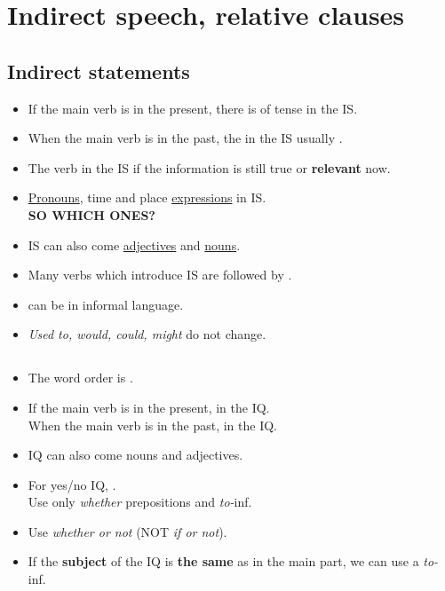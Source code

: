 \section{Indirect speech, relative clauses}

\subsection{Indirect statements}
\begin{itemize}
    \item If the main verb is in the present,
    there is  of tense in the IS.
    \item When the main verb is in the past,
    the  in the IS usually .
    \item The verb in the IS 
    if the information is still true or \textbf{relevant} now.
    \item \underline{Pronouns}, time and place \underline{expressions}  in IS.\\
    \textbf{SO WHICH ONES?}
    \item[\doot] IS can also come  \underline{adjectives} and \underline{nouns}.
    \item[\doot] Many verbs which introduce IS are followed by .
    \item {} can be  in informal language.
    \item[\ast] \textit{Used to, would, could, might} do not change.
\end{itemize}

\subsection{}
\begin{itemize}
    \item[\doot] The word order is .
    \item[\doot] If the main verb is in the present,  in the IQ.\\
    When the main verb is in the past,  in the IQ.
    \item[\doot] IQ can also come  nouns and adjectives.
    \item[\doot] For yes/no IQ, .\\
    Use only \textit{whether}  prepositions and  \textit{to-}inf.
    \item[\aast] Use \textit{whether or not} (NOT \textit{if or not}).
    \item[\doot] If the \textbf{subject} of the IQ is \textbf{the same} as in the main part,
    we can use a \textit{to-}inf.
\end{itemize}

